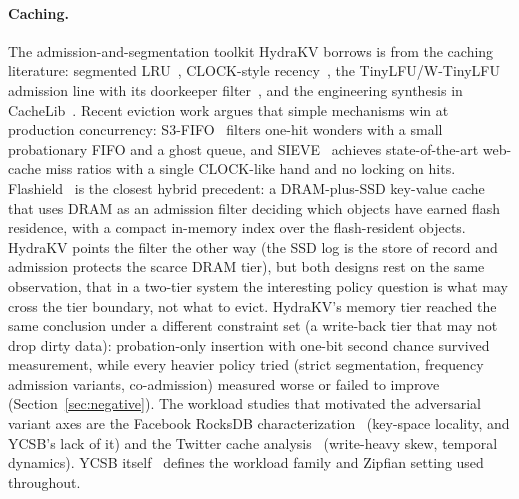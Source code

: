 \documentclass{article}
\begin{document}
\paragraph{Caching.} The admission-and-segmentation toolkit HydraKV borrows is from the caching literature: segmented LRU~\cite{slru}, CLOCK-style recency~\cite{clock}, the TinyLFU/W-TinyLFU admission line with its doorkeeper filter~\cite{tinylfu}, and the engineering synthesis in CacheLib~\cite{cachelib}. Recent eviction work argues that simple mechanisms win at production concurrency: S3-FIFO~\cite{s3fifo} filters one-hit wonders with a small probationary FIFO and a ghost queue, and SIEVE~\cite{sieve} achieves state-of-the-art web-cache miss ratios with a single CLOCK-like hand and no locking on hits. Flashield~\cite{flashield} is the closest hybrid precedent: a DRAM-plus-SSD key-value cache that uses DRAM as an admission filter deciding which objects have earned flash residence, with a compact in-memory index over the flash-resident objects. HydraKV points the filter the other way (the SSD log is the store of record and admission protects the scarce DRAM tier), but both designs rest on the same observation, that in a two-tier system the interesting policy question is what may cross the tier boundary, not what to evict. HydraKV's memory tier reached the same conclusion under a different constraint set (a write-back tier that may not drop dirty data): probation-only insertion with one-bit second chance survived measurement, while every heavier policy tried (strict segmentation, frequency admission variants, co-admission) measured worse or failed to improve (Section~\ref{sec:negative}). The workload studies that motivated the adversarial variant axes are the Facebook RocksDB characterization~\cite{cao-fast20} (key-space locality, and YCSB's lack of it) and the Twitter cache analysis~\cite{yang-osdi20} (write-heavy skew, temporal dynamics). YCSB itself~\cite{ycsb} defines the workload family and Zipfian setting used throughout.
\end{document}
